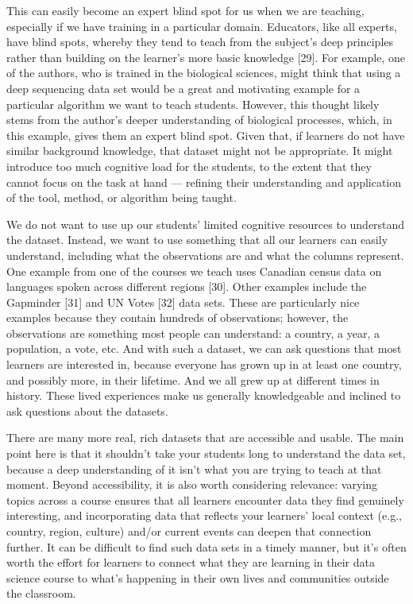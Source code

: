 \documentclass[
  10pt,
  letterpaper,
]{article}
\begin{document}
This can easily become an expert blind spot for us when we are teaching,
especially if we have training in a particular domain. Educators, like
all experts, have blind spots, whereby they tend to teach from the
subject's deep principles rather than building on the learner's more
basic knowledge {[}29{]}. For example, one of the authors, who is
trained in the biological sciences, might think that using a deep
sequencing data set would be a great and motivating example for a
particular algorithm we want to teach students. However, this thought
likely stems from the author's deeper understanding of biological
processes, which, in this example, gives them an expert blind spot.
Given that, if learners do not have similar background knowledge, that
dataset might not be appropriate. It might introduce too much cognitive
load for the students, to the extent that they cannot focus on the task
at hand --- refining their understanding and application of the tool,
method, or algorithm being taught.

We do not want to use up our students' limited cognitive resources to
understand the dataset. Instead, we want to use something that all our
learners can easily understand, including what the observations are and
what the columns represent. One example from one of the courses we teach
uses Canadian census data on languages spoken across different regions
{[}30{]}. Other examples include the Gapminder {[}31{]} and UN Votes
{[}32{]} data sets. These are particularly nice examples because they
contain hundreds of observations; however, the observations are
something most people can understand: a country, a year, a population, a
vote, etc. And with such a dataset, we can ask questions that most
learners are interested in, because everyone has grown up in at least
one country, and possibly more, in their lifetime. And we all grew up at
different times in history. These lived experiences make us generally
knowledgeable and inclined to ask questions about the datasets.

There are many more real, rich datasets that are accessible and usable.
The main point here is that it shouldn't take your students long to
understand the data set, because a deep understanding of it isn't what
you are trying to teach at that moment. Beyond accessibility, it is also
worth considering relevance: varying topics across a course ensures that
all learners encounter data they find genuinely interesting, and
incorporating data that reflects your learners' local context (e.g.,
country, region, culture) and/or current events can deepen that
connection further. It can be difficult to find such data sets in a
timely manner, but it's often worth the effort for learners to connect
what they are learning in their data science course to what's happening
in their own lives and communities outside the classroom.
\end{document}
